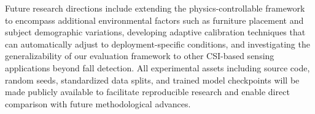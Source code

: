 \documentclass[10pt,conference]{IEEEtran}
\begin{document}
Future research directions include extending the physics-controllable framework to encompass additional environmental factors such as furniture placement and subject demographic variations, developing adaptive calibration techniques that can automatically adjust to deployment-specific conditions, and investigating the generalizability of our evaluation framework to other CSI-based sensing applications beyond fall detection. All experimental assets including source code, random seeds, standardized data splits, and trained model checkpoints will be made publicly available to facilitate reproducible research and enable direct comparison with future methodological advances.



\end{document}
